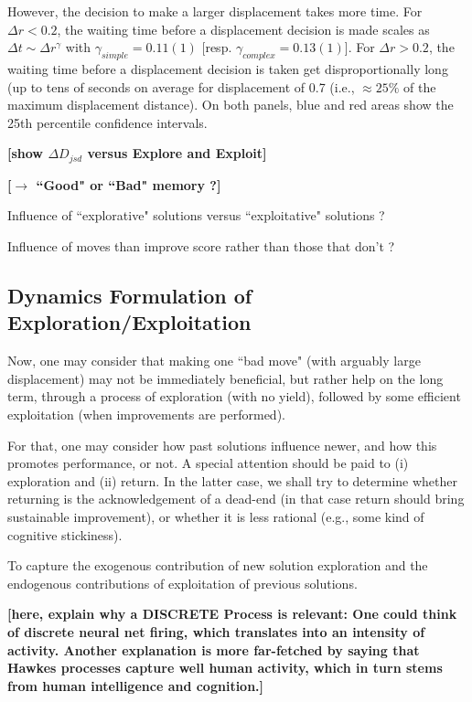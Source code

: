 However, the decision to make a larger displacement takes more time. For $\Delta r < 0.2$, the waiting time before a displacement decision is made scales as $\Delta t \sim \Delta r^{\gamma}$ with $\gamma_{simple} = 0.11(1)$ [resp. $\gamma_{complex} = 0.13(1)$]. For $\Delta r > 0.2$, the waiting time before a displacement decision is taken get disproportionally long (up to tens of seconds on average for displacement of 0.7 (i.e., $\approx 25\%$ of the maximum displacement distance). On both panels, blue and red areas show the 25th percentile confidence intervals.


{\bf [show $\Delta D_{jsd}$ versus Explore and Exploit]}

{\bf [$\rightarrow$  ``Good" or ``Bad" memory ?]}


Influence of ``explorative" solutions versus ``exploitative" solutions ?

Influence of moves than improve score rather than those that don't ?



\subsection{Dynamics Formulation of Exploration/Exploitation}

Now, one may consider that making one ``bad move" (with arguably large displacement) may not be immediately beneficial, but rather help on the long term, through a process of exploration (with no yield), followed by some efficient exploitation (when improvements are performed).

For that, one may consider how past solutions influence newer, and how this promotes performance, or not. A special attention should be paid to (i) exploration and (ii) return. In the latter case, we shall try to determine whether returning is the acknowledgement of a dead-end (in that case return should bring sustainable improvement), or whether it is less rational (e.g., some kind of cognitive stickiness).

To capture the exogenous contribution of new solution exploration and the endogenous contributions of exploitation of previous solutions.

{\bf [here, explain why a DISCRETE Process is relevant: One could think of discrete neural net firing, which translates into an intensity of activity. Another explanation is more far-fetched by saying that Hawkes processes capture well human activity, which in turn stems from human intelligence and cognition.]}

